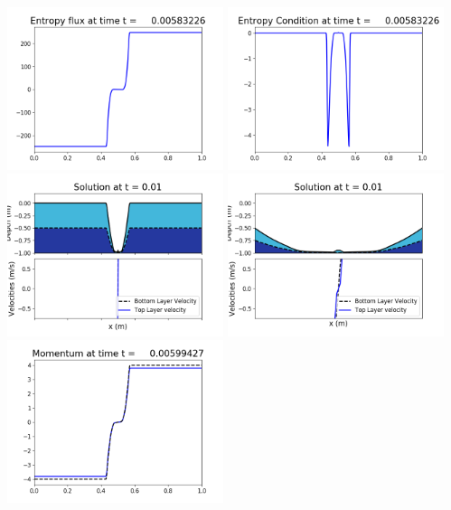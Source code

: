 \documentclass[11pt]{article}
\begin{document}
\includegraphics[width=0.475\textwidth]{frame0037fig1008.png}
\vskip 10pt 
\includegraphics[width=0.475\textwidth]{frame0037fig1009.png}
\vskip 10pt 
\includegraphics[width=0.475\textwidth]{frame0038fig1001.png}
\includegraphics[width=0.475\textwidth]{frame0038fig1002.png}
\vskip 10pt 
\includegraphics[width=0.475\textwidth]{frame0038fig1003.png}
\end{document}
